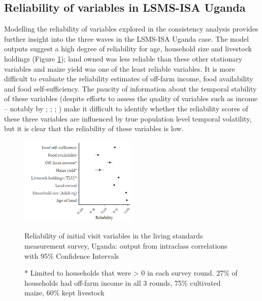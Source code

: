 \subsection{Reliability of variables in LSMS-ISA Uganda}

Modelling the reliability of variables explored in the consistency analysis provides further insight into the three waves in the LSMS-ISA Uganda case. The model outputs suggest a high degree of reliability for age, household size and livestock holdings (Figure \ref{fig:03_4}); land owned was less reliable than these other stationary variables and maize yield was one of the least reliable variables. It is more difficult to evaluate the reliability estimates of off-farm income, food availability and food self-sufficiency. The paucity of information about the temporal stability of these variables (despite efforts to assess the quality of variables such as income -- notably by \citealp{Neri2012}; \citealp{Fisher2010}; \citealp{Juster2007}; \citealp{Moore2000}) make it difficult to identify whether the reliability scores of these three variables are influenced by true population level temporal volatility, but it is clear that the reliability of these variables is low.

\begin{figure}[H]
  \includegraphics[width=0.5\textwidth]{figs_03/image4.png}
  \captionsetup{singlelinecheck = off, justification=justified}
    \caption{Reliability of initial visit variables in the living standards measurement survey, Uganda: output from intraclass correlations with 95\% Confidence Intervals}
  \label{fig:03_4}
  \small
  \vspace*{-6mm}
  \caption*{* Limited to households that were {\textgreater} 0 in each survey round. 27\% of households had off-farm income in all 3 rounds, 75\% cultivated maize, 60\% kept livestock}
\end{figure}
\vspace*{-6mm}



